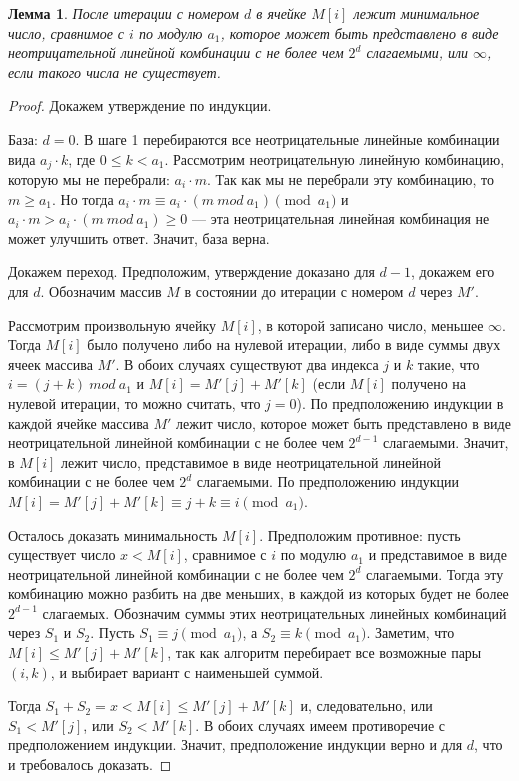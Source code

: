 \documentclass[12pt]{article}
\newtheorem{lemma}[theorem]{Лемма}
\theoremstyle{definition}
\begin{document}
\begin{lemma}
\label{algorithm:lemma2}
После итерации с номером $d$ в ячейке $M[i]$ лежит минимальное число, сравнимое с $i$ по модулю $a_1$, которое может быть представлено в виде неотрицательной линейной комбинации с не более чем $2^d$ слагаемыми, или $\infty$, если такого числа не существует.
\end{lemma}
\begin{proof}
Докажем утверждение по индукции.

База: $d = 0$. В шаге 1 перебираются все неотрицательные линейные комбинации вида $a_j \cdot k$, где $0 \le k < a_1$. Рассмотрим неотрицательную линейную комбинацию, которую мы не перебрали: $a_i \cdot m$. Так как мы не перебрали эту комбинацию, то $m \ge a_1$. Но тогда $a_i \cdot m \equiv a_i \cdot (m \ mod \ a_1) \pmod {a_1}$ и $a_i \cdot m > a_i \cdot (m \ mod \ a_1) \ge 0$ --- эта неотрицательная линейная комбинация не может улучшить ответ. Значит, база верна.

Докажем переход. Предположим, утверждение доказано для $d - 1$, докажем его для $d$. Обозначим массив $M$ в состоянии до итерации с номером $d$ через $M'$.

Рассмотрим произвольную ячейку $M[i]$, в которой записано число, меньшее $\infty$. Тогда $M[i]$ было получено либо на нулевой итерации, либо в виде суммы двух ячеек массива $M'$. В обоих случаях существуют два индекса $j$ и $k$ такие, что $i = (j + k) \ mod \ a_1$ и $M[i] = M'[j] + M'[k]$ (если $M[i]$ получено на нулевой итерации, то можно считать, что $j = 0$). По предположению индукции в каждой ячейке массива $M'$ лежит число, которое может быть представлено в виде неотрицательной линейной комбинации с не более чем $2^{d - 1}$ слагаемыми. Значит, в $M[i]$ лежит число, представимое в виде неотрицательной линейной комбинации с не более чем $2^d$ слагаемыми. По предположению индукции $M[i] = M'[j] + M'[k] \equiv j + k \equiv i \pmod{a_1}$.

Осталось доказать минимальность $M[i]$. Предположим противное: пусть существует число $x < M[i]$, сравнимое с $i$ по модулю $a_1$ и представимое в виде неотрицательной линейной комбинации с не более чем $2^d$ слагаемыми. Тогда эту комбинацию можно разбить на две меньших, в каждой из которых будет не более $2^{d - 1}$ слагаемых. Обозначим суммы этих неотрицательных линейных комбинаций через $S_1$ и $S_2$. Пусть $S_1 \equiv j \pmod{a_1}$, а $S_2 \equiv k \pmod{a_1}$. Заметим, что $M[i] \le M'[j] + M'[k]$, так как алгоритм перебирает все возможные пары $(i, k)$, и выбирает вариант с наименьшей суммой.

Тогда $S_1 + S_2 = x < M[i] \le M'[j] + M'[k]$ и, следовательно, или $S_1 < M'[j]$, или $S_2 < M'[k]$. В обоих случаях имеем противоречие с предположением индукции. Значит, предположение индукции верно и для $d$, что и требовалось доказать.
\end{proof}
\end{document}
